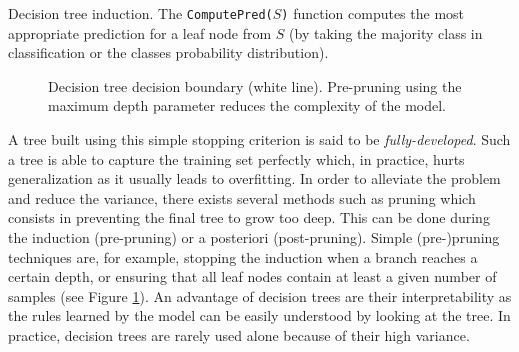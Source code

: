 \begin{algorithm}[t]
  \SetAlgoLined
  
  \;
\caption{Decision tree induction. The \texttt{ComputePred($S$)} function computes the most appropriate prediction for a leaf node from $S$ (\eg by taking the majority class in classification or the classes probability distribution).}
\label{algo:backml:dtinduction}
\end{algorithm}

\begin{figure}
  \centering
  \caption{Decision tree decision boundary (white line). Pre-pruning using the maximum depth parameter reduces the complexity of the model.}
  \label{fig:backml:dt_boundary}
\end{figure}

A tree built using this simple stopping criterion is said to be \textit{fully-developed}. Such a tree is able to capture the training set perfectly which, in practice, hurts generalization as it usually leads to overfitting. In order to alleviate the problem and reduce the variance, there exists several methods such as pruning which consists in preventing the final tree to grow too deep. This can be done during the induction (pre-pruning) or a posteriori (post-pruning). Simple (pre-)pruning techniques are, for example, stopping the induction when a branch reaches a certain depth, or ensuring that all leaf nodes contain at least a given number of samples (see Figure \ref{fig:backml:dt_boundary}). An advantage of decision trees are their interpretability as the rules learned by the model can be easily understood by looking at the tree. In practice, decision trees are rarely used alone because of their high variance.

